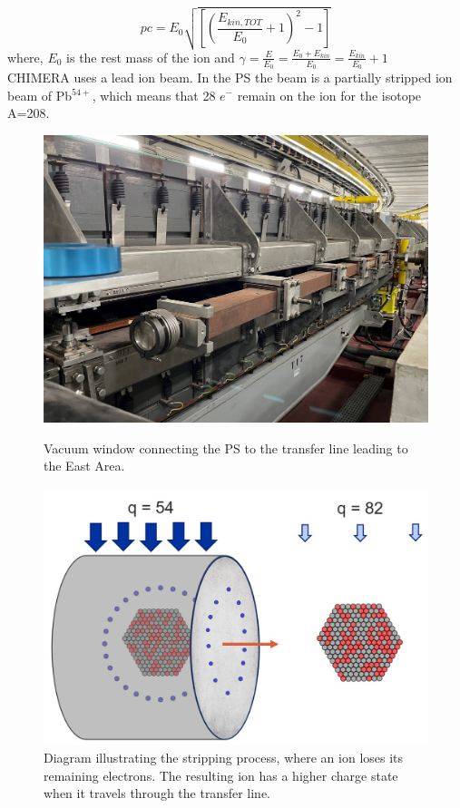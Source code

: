 \documentclass{cernatsnote}
\begin{document}
$$pc = E_{0}\sqrt{\left [ \left( \frac{E_{kin, TOT}}{E_{0}}+1\right )^{2}-1\right ]}$$
where, $E_{0}$ is the rest mass of the ion and $\gamma=\frac{E}{E_{0}}=\frac{E_{0}+E_{kin}}{E_{0}} = \frac{E_{kin}}{E_{0}}+1$
\\

CHIMERA uses a lead ion beam. In the PS the beam is a partially stripped ion beam of Pb$^{54+}$, which means that 28 $e^{-}$ remain on the ion for the isotope A=208.
\\

\begin{figure}
    \centering
    \begin{minipage}{0.45\textwidth}
        \centering
        \includegraphics[width=1.0\textwidth]{images/PS_BEAM_ENERGY/vaccum_window.jpg}
        \caption{Vacuum window connecting the PS to the transfer line leading to the East Area.}
        \label{fig:vaccum window}
    \end{minipage}\hfill
    \begin{minipage}{0.45\textwidth}
        \centering
        \includegraphics[width=1.0\textwidth]{images/PS_BEAM_ENERGY/stripping.jpg} 
        \caption{Diagram illustrating the stripping process, where an ion loses its remaining electrons. The resulting ion has a higher charge state when it travels through the transfer line.}
        \label{fig:stripping}
    \end{minipage}
\end{figure}
\end{document}
